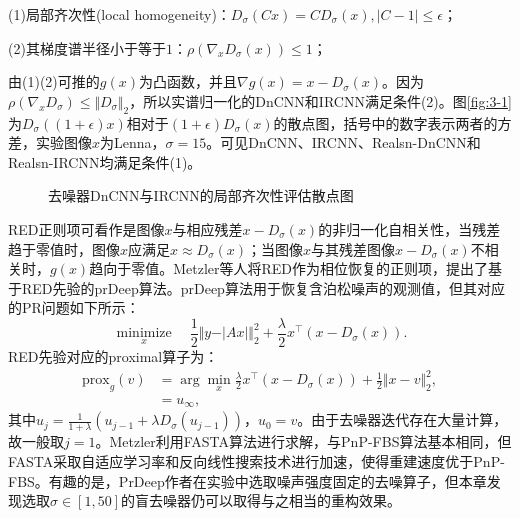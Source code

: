 (1)局部齐次性(local homogeneity)：$D_{\sigma}(Cx)=CD_{\sigma}(x),\vert{C-1}\vert\leq\epsilon$；

(2)其梯度谱半径小于等于$1$：$\rho(\nabla_{x}D_{\sigma}(x))\leq{1}$；

由(1)(2)可推的$g(x)$为凸函数，并且$\nabla{g(x)}=x-D_{\sigma}(x)$。因为$\rho(\nabla_{x}D_{\sigma})\leq\Vert{D_{\sigma}}\Vert_2$，所以实谱归一化的DnCNN和IRCNN满足条件(2)。图\ref{fig:3-1}为$D_{\sigma}((1+\epsilon)x)$相对于$(1+\epsilon)D_{\sigma}(x)$的散点图，括号中的数字表示两者的方差，实验图像$x$为Lenna，$\sigma=15$。可见DnCNN、IRCNN、Realsn-DnCNN和Realsn-IRCNN均满足条件(1)。
\begin{figure}[!htbp]
	\vspace*{-0.05\linewidth}
	\centering
	\subfigure[DnCNN(3.74e-4)]{
		\texttt{[image: 3-2-1]}  
	}
	\subfigure[IRCNN(3.33e-4)]{
		\texttt{[image: 3-2-2]}  
	}
	
	\caption{去噪器DnCNN与IRCNN的局部齐次性评估散点图} \label{fig:3-2}
\end{figure}

RED正则项可看作是图像$x$与相应残差$x-D_{\sigma}(x)$的非归一化自相关性，当残差趋于零值时，图像$x$应满足$x\approx{D_{\sigma}(x)}$；当图像$x$与其残差图像$x-D_{\sigma}(x)$不相关时，$g(x)$趋向于零值。Metzler等人将RED作为相位恢复的正则项，提出了基于RED先验的prDeep算法\supercite{Metzler1}。prDeep算法用于恢复含泊松噪声的观测值，但其对应的PR问题如下所示：
\begin{equation} \label{problem:3-4}
	\mathop{\text{minimize}}\limits_{x}\quad \frac{1}{2}{\Vert{y-\vert{Ax}\vert}\Vert_2^2} + \frac{\lambda}{2}x^\top(x-D_{\sigma}(x)).
\end{equation}
RED先验对应的proximal算子为：
\begin{equation} \label{equation:3-12}
	\begin{aligned} 
		\text{prox}_{g}(v)&=\arg\min_{x}\frac{\lambda}{2}x^\top(x-D_{\sigma}(x))+\frac{1}{2}\Vert{x-v}\Vert_2^2,\\
		&=u_{\infty},
	\end{aligned}
\end{equation}
其中$u_j=\frac{1}{1+\lambda}(u_{j-1}+\lambda{D_{\sigma}(u_{j-1})})$，$u_0=v$。由于去噪器迭代存在大量计算，故一般取$j=1$。Metzler利用FASTA算法进行求解，与PnP-FBS算法基本相同，但FASTA采取自适应学习率和反向线性搜索技术进行加速，使得重建速度优于PnP-FBS\supercite{Goldstein}。有趣的是，PrDeep作者在实验中选取噪声强度固定的去噪算子，但本章发现选取$\sigma\in[1,50]$的盲去噪器仍可以取得与之相当的重构效果。

